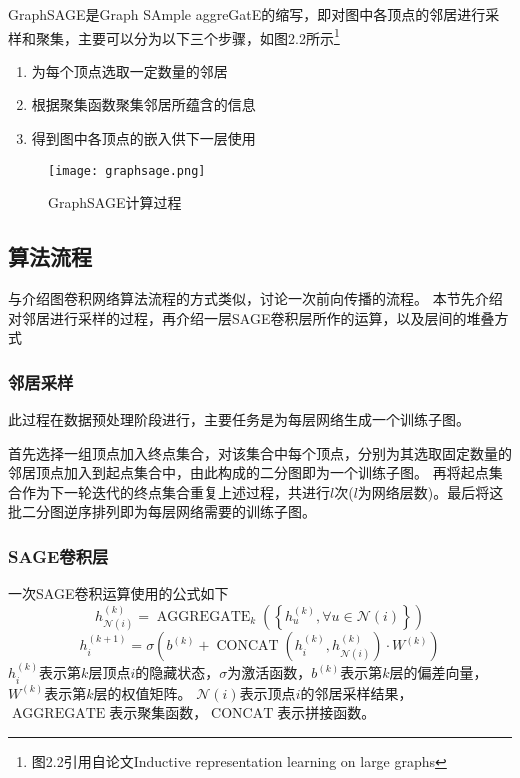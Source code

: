 GraphSAGE是Graph SAmple aggreGatE的缩写，即对图中各顶点的邻居进行采样和聚集，主要可以分为以下三个步骤，如图2.2所示\footnote{图2.2引用自论文Inductive representation learning on large graphs}
\begin{enumerate}
    \item 为每个顶点选取一定数量的邻居
    \item 根据聚集函数聚集邻居所蕴含的信息
    \item 得到图中各顶点的嵌入供下一层使用
\end{enumerate}

\begin{figure}[htb]
    \centering
    \texttt{[image: graphsage.png]}
    \caption{GraphSAGE计算过程}
\end{figure}

\subsection{算法流程}
与介绍图卷积网络算法流程的方式类似，讨论一次前向传播的流程。
本节先介绍对邻居进行采样的过程，再介绍一层SAGE卷积层所作的运算，以及层间的堆叠方式

\subsubsection{邻居采样}
此过程在数据预处理阶段进行，主要任务是为每层网络生成一个训练子图。

首先选择一组顶点加入终点集合，对该集合中每个顶点，分别为其选取固定数量的邻居顶点加入到起点集合中，由此构成的二分图即为一个训练子图。
再将起点集合作为下一轮迭代的终点集合重复上述过程，共进行$l$次($l$为网络层数)。最后将这批二分图逆序排列即为每层网络需要的训练子图。

\subsubsection{SAGE卷积层}
\begin{definition}
    一次SAGE卷积运算使用的公式如下
    \begin{equation}
        {h}_{\mathcal{N}(i)}^{(k)} = \operatorname{AGGREGATE}_{k}\left(\left\{{h}_{u}^{(k)}, \forall u \in \mathcal{N}(i)\right\}\right)
    \end{equation}
    \begin{equation}
        {h}_{i}^{(k+1)} = \sigma\left(b^{(k)} + \operatorname{CONCAT}\left({h}_{i}^{(k)}, {h}_{\mathcal{N}(i)}^{(k)}\right) \cdot {W}^{(k)}\right)
    \end{equation}
    $h^{(k)}_i$表示第$k$层顶点$i$的隐藏状态，$\sigma$为激活函数，$b^{(k)}$表示第$k$层的偏差向量，$W^{(k)}$表示第$k$层的权值矩阵。
    $\mathcal{N}(i)$表示顶点$i$的邻居采样结果，$\operatorname{AGGREGATE}$表示聚集函数，$\operatorname{CONCAT}$表示拼接函数。
\end{definition}

